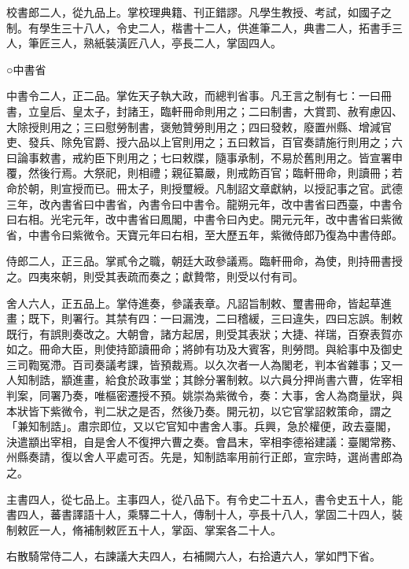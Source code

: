 \begin{pinyinscope}
 校書郎二人，從九品上。掌校理典籍、刊正錯謬。凡學生教授、考試，如國子之制。有學生三十八人，令史二人，楷書十二人，供進筆二人，典書二人，拓書手三人，筆匠三人，熟紙裝潢匠八人，亭長二人，掌固四人。



 ○中書省



 中書令二人，正二品。掌佐天子執大政，而總判省事。凡王言之制有七：一曰冊書，立皇后、皇太子，封諸王，臨軒冊命則用之；二曰制書，大賞罰、赦宥慮囚、大除授則用之；三曰慰勞制書，褒勉贊勞則用之；四曰發敕，廢置州縣、增減官吏、發兵、除免官爵、授六品以上官則用之；五曰敕旨，百官奏請施行則用之；六曰論事敕書，戒約臣下則用之；七曰敕牒，隨事承制，不易於舊則用之。皆宣署申覆，然後行焉。大祭祀，則相禮；親征纂嚴，則戒飭百官；臨軒冊命，則讀冊；若命於朝，則宣授而已。冊太子，則授璽綬。凡制詔文章獻納，以授記事之官。武德三年，改內書省曰中書省，內書令曰中書令。龍朔元年，改中書省曰西臺，中書令曰右相。光宅元年，改中書省曰鳳閣，中書令曰內史。開元元年，改中書省曰紫微省，中書令曰紫微令。天寶元年曰右相，至大歷五年，紫微侍郎乃復為中書侍郎。



 侍郎二人，正三品。掌貳令之職，朝廷大政參議焉。臨軒冊命，為使，則持冊書授之。四夷來朝，則受其表疏而奏之；獻贄幣，則受以付有司。



 舍人六人，正五品上。掌侍進奏，參議表章。凡詔旨制敕、璽書冊命，皆起草進畫；既下，則署行。其禁有四：一曰漏洩，二曰稽緩，三曰違失，四曰忘誤。制敕既行，有誤則奏改之。大朝會，諸方起居，則受其表狀；大捷、祥瑞，百寮表賀亦如之。冊命大臣，則使持節讀冊命；將帥有功及大賓客，則勞問。與給事中及御史三司鞫冤滯。百司奏議考課，皆預裁焉。以久次者一人為閣老，判本省雜事；又一人知制誥，顓進畫，給食於政事堂；其餘分署制敕。以六員分押尚書六曹，佐宰相判案，同署乃奏，唯樞密遷授不預。姚崇為紫微令，奏：大事，舍人為商量狀，與本狀皆下紫微令，判二狀之是否，然後乃奏。開元初，以它官掌詔敕策命，謂之「兼知制誥」。肅宗即位，又以它官知中書舍人事。兵興，急於權便，政去臺閣，決遣顓出宰相，自是舍人不復押六曹之奏。會昌末，宰相李德裕建議：臺閣常務、州縣奏請，復以舍人平處可否。先是，知制誥率用前行正郎，宣宗時，選尚書郎為之。



 主書四人，從七品上。主事四人，從八品下。有令史二十五人，書令史五十人，能書四人，蕃書譯語十人，乘驛二十人，傳制十人，亭長十八人，掌固二十四人，裝制敕匠一人，脩補制敕匠五十人，掌函、掌案各二十人。



 右散騎常侍二人，右諫議大夫四人，右補闕六人，右拾遺六人，掌如門下省。




\end{pinyinscope}
